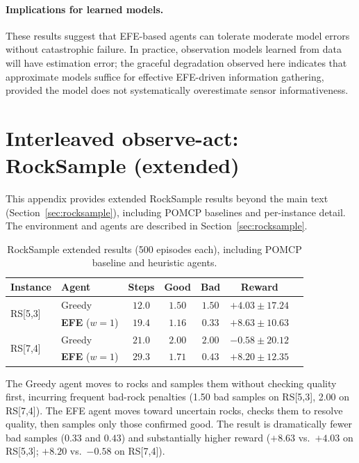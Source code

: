 \documentclass{article}
\begin{document}
\paragraph{Implications for learned models.} These results suggest that EFE-based agents can tolerate moderate model errors without catastrophic failure. In practice, observation models learned from data will have estimation error; the graceful degradation observed here indicates that approximate models suffice for effective EFE-driven information gathering, provided the model does not systematically overestimate sensor informativeness.

\section{Interleaved observe-act: RockSample (extended)}
\label{app:rocksample}

This appendix provides extended RockSample results beyond the main text (Section~\ref{sec:rocksample}), including POMCP baselines and per-instance detail. The environment and agents are described in Section~\ref{sec:rocksample}.

\begin{table}[h]
\centering
\caption{RockSample extended results (500 episodes each), including POMCP baseline and heuristic agents.}
\label{tab:rocksample_extended}
\begin{small}
\begin{tabular}{llccccc}
\toprule
Instance & Agent & Steps & Good & Bad & Reward \\
\midrule
\multirow{2}{*}{RS[5,3]} & Greedy & $12.0$ & $1.50$ & $1.50$ & $+4.03 \pm 17.24$ \\
& \textbf{EFE} ($w{=}1$) & $19.4$ & $1.16$ & $\mathbf{0.33}$ & $\mathbf{+8.63 \pm 10.63}$ \\
\midrule
\multirow{2}{*}{RS[7,4]} & Greedy & $21.0$ & $2.00$ & $2.00$ & $-0.58 \pm 20.12$ \\
& \textbf{EFE} ($w{=}1$) & $29.3$ & $1.71$ & $\mathbf{0.43}$ & $\mathbf{+8.20 \pm 12.35}$ \\
\bottomrule
\end{tabular}
\end{small}
\end{table}

The Greedy agent moves to rocks and samples them without checking quality first, incurring frequent bad-rock penalties (1.50 bad samples on RS[5,3], 2.00 on RS[7,4]). The EFE agent moves toward uncertain rocks, checks them to resolve quality, then samples only those confirmed good. The result is dramatically fewer bad samples ($0.33$ and $0.43$) and substantially higher reward ($+8.63$ vs.\ $+4.03$ on RS[5,3]; $+8.20$ vs.\ $-0.58$ on RS[7,4]).
\end{document}
